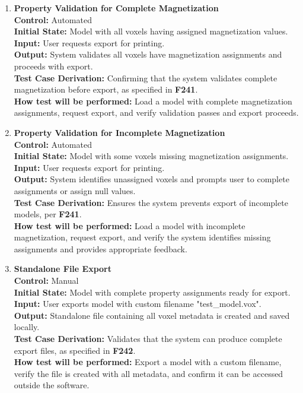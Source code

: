 \documentclass[12pt, titlepage]{article}
\begin{document}
\begin{enumerate}
  \item \textbf{Property Validation for Complete Magnetization} \\[2mm]
    \textbf{Control:} Automated \\ 
    \textbf{Initial State:} Model with all voxels having assigned magnetization values. \\ 
    \textbf{Input:} User requests export for printing. \\ 
    \textbf{Output:} System validates all voxels have magnetization assignments and proceeds with export. \\[2mm]
    \textbf{Test Case Derivation:} Confirming that the system validates complete magnetization before export, as specified in \textbf{F241}. \\[2mm]
    \textbf{How test will be performed:} Load a model with complete magnetization assignments, request export, and verify validation passes and export proceeds.

  \item \textbf{Property Validation for Incomplete Magnetization} \\[2mm]
    \textbf{Control:} Automated \\ 
    \textbf{Initial State:} Model with some voxels missing magnetization assignments. \\ 
    \textbf{Input:} User requests export for printing. \\ 
    \textbf{Output:} System identifies unassigned voxels and prompts user to complete assignments or assign null values. \\[2mm]
    \textbf{Test Case Derivation:} Ensures the system prevents export of incomplete models, per \textbf{F241}. \\[2mm]
    \textbf{How test will be performed:} Load a model with incomplete magnetization, request export, and verify the system identifies missing assignments and provides appropriate feedback.

  \item \textbf{Standalone File Export} \\[2mm]
    \textbf{Control:} Manual \\ 
    \textbf{Initial State:} Model with complete property assignments ready for export. \\ 
    \textbf{Input:} User exports model with custom filename "test\_model.vox". \\ 
    \textbf{Output:} Standalone file containing all voxel metadata is created and saved locally. \\[2mm]
    \textbf{Test Case Derivation:} Validates that the system can produce complete export files, as specified in \textbf{F242}. \\[2mm]
    \textbf{How test will be performed:} Export a model with a custom filename, verify the file is created with all metadata, and confirm it can be accessed outside the software.


\end{enumerate}
\end{document}
